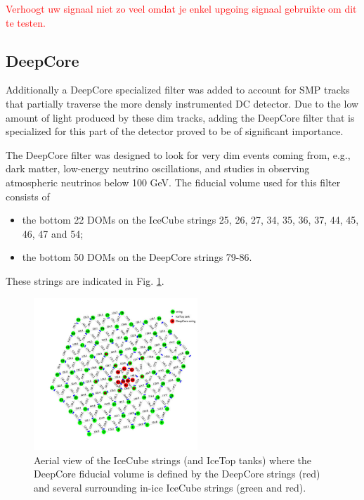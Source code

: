 \textcolor{red}{Verhoogt uw signaal niet zo veel omdat je enkel upgoing signaal gebruikte om dit te testen.}

\subsection{DeepCore}
Additionally a DeepCore specialized filter was added to account for SMP tracks that partially traverse the more densly instrumented DC detector. Due to the low amount of light produced by these dim tracks, adding the DeepCore filter that is specialized for this part of the detector proved to be of significant importance.

The DeepCore filter was designed to look for very dim events coming from, e.g., dark matter, low-energy neutrino oscillations, and studies in observing atmospheric neutrinos below 100 GeV. The fiducial volume used for this filter consists of
\vspace{2mm}
\begin{itemize}
\item the bottom 22 DOMs on the IceCube strings 25, 26, 27, 34, 35, 36, 37, 44, 45, 46, 47 and 54;
\item the bottom 50 DOMs on the DeepCore strings 79-86.
\end{itemize}
\vspace{2mm}
These strings are indicated in Fig. \ref{fig:deepcorestrings}.\\

\begin{figure}[t]
\centering
\includegraphics[width=0.55\textwidth]{chapter8/img/stringview.jpg}
\caption{Aerial view of the IceCube strings (and IceTop tanks) where the DeepCore fiducial volume is defined by the DeepCore strings (red) and several surrounding in-ice IceCube strings (green and red).}
\label{fig:deepcorestrings}
\end{figure}

